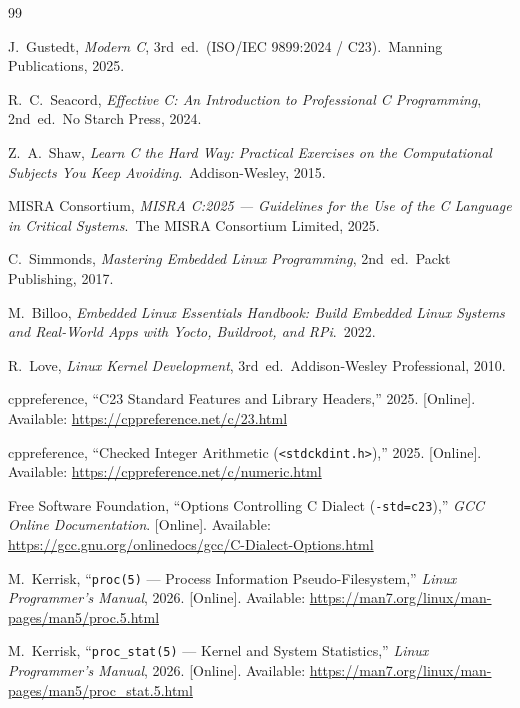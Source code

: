 \documentclass[11pt,a4paper]{article}
\begin{document}
\begin{thebibliography}{99}

J.~Gustedt, \emph{Modern C}, 3rd~ed.\ (ISO/IEC 9899:2024 / C23).\ Manning Publications, 2025.

R.~C.~Seacord, \emph{Effective C: An Introduction to Professional C Programming}, 2nd~ed.\ No Starch Press, 2024.

Z.~A.~Shaw, \emph{Learn C the Hard Way: Practical Exercises on the Computational Subjects You Keep Avoiding}.\ Addison-Wesley, 2015.

MISRA Consortium, \emph{MISRA C:2025 --- Guidelines for the Use of the C Language in Critical Systems}.\ The MISRA Consortium Limited, 2025.

C.~Simmonds, \emph{Mastering Embedded Linux Programming}, 2nd~ed.\ Packt Publishing, 2017.

M.~Billoo, \emph{Embedded Linux Essentials Handbook: Build Embedded Linux Systems and Real-World Apps with Yocto, Buildroot, and RPi}.\ 2022.

R.~Love, \emph{Linux Kernel Development}, 3rd~ed.\ Addison-Wesley Professional, 2010.

cppreference, ``C23 Standard Features and Library Headers,'' 2025. [Online]. Available: \url{https://cppreference.net/c/23.html}

cppreference, ``Checked Integer Arithmetic (\texttt{<stdckdint.h>}),'' 2025. [Online]. Available: \url{https://cppreference.net/c/numeric.html}

Free Software Foundation, ``Options Controlling C Dialect (\texttt{-std=c23}),'' \emph{GCC Online Documentation}. [Online]. Available: \url{https://gcc.gnu.org/onlinedocs/gcc/C-Dialect-Options.html}

M.~Kerrisk, ``\texttt{proc(5)} --- Process Information Pseudo-Filesystem,'' \emph{Linux Programmer's Manual}, 2026. [Online]. Available: \url{https://man7.org/linux/man-pages/man5/proc.5.html}

M.~Kerrisk, ``\texttt{proc\_stat(5)} --- Kernel and System Statistics,'' \emph{Linux Programmer's Manual}, 2026. [Online]. Available: \url{https://man7.org/linux/man-pages/man5/proc_stat.5.html}


\end{thebibliography}
\end{document}
